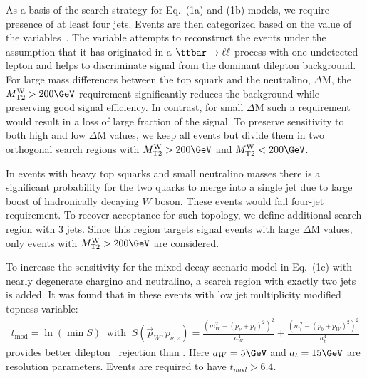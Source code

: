 As a basis of the search strategy for Eq.~(1a) and (1b) models, we require presence of at least four jets. 
Events are then categorized based on the value of the \MTtW variables~\cite{Bai:2012gs}. The \MTtW variable attempts to reconstruct
the events under the assumption that it has originated in a $\ttbar\rightarrow\ell\ell$ process with one undetected lepton and  
helps to discriminate signal from the dominant dilepton \ttbar background. For large mass differences between the 
top squark and the neutralino, $\Delta$M, the $\MTtW>200\GeV$ requirement significantly reduces the background while preserving good 
signal efficiency. In contrast, for small $\Delta$M such a requirement would result in a loss of large fraction of the signal.
To preserve sensitivity to both high and low $\Delta$M values, we keep all events but divide them in two orthogonal search regions 
with $\MTtW>200\GeV$ and $\MTtW<200\GeV$.

In events with heavy top squarks and small neutralino masses there is a significant probability for the two quarks to merge into a single 
jet due to large boost of hadronically decaying $W$ boson. These events would fail four-jet requirement. To recover acceptance for such topology,
 we define additional search region with 3 jets. Since this region targets signal events with large $\Delta$M values, only events with 
$\MTtW>200\GeV$ are considered.

To increase the sensitivity for the mixed decay scenario model in Eq.~(1c) with nearly degenerate chargino and neutralino, 
a search region with exactly two jets is added. It was found that in these events with low jet multiplicity modified topness 
variable:
\begin{align} \label{eq:modtopness}
t_\mathrm{mod} = \ln(\min S)~\text{ with }~ S(\vec{p}_W, p_{\nu,z}) = \frac{(m_W^2-(p_\nu+p_\ell)^2)^2}{a_W^4} + 
\frac{(m_t^2 - (p_{b}+p_W)^2)^2}{a_t^4}
\end{align}
provides better dilepton \ttbar\ rejection than \MTtW. Here $a_W = 5\GeV$ and $a_t = 15\GeV$ are resolution parameters. 
Events are required to have $t_{mod}>6.4$.


